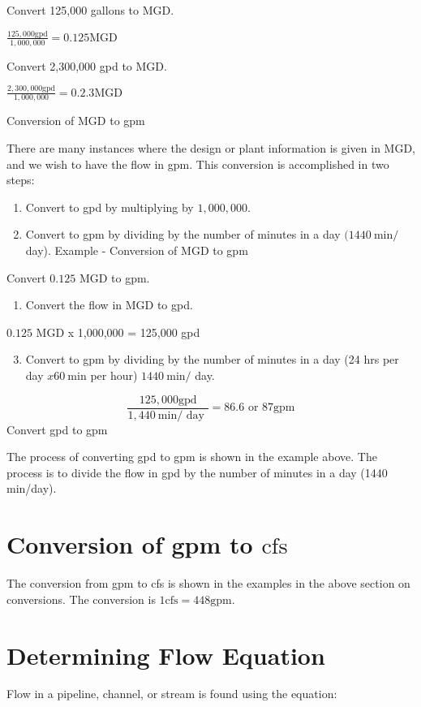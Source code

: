 Convert 125,000 gallons to MGD.

$\frac{125,000 \mathrm{gpd}}{1,000,000}=0.125 \mathrm{MGD}$

Convert 2,300,000 gpd to MGD.

$\frac{2,300,000 \mathrm{gpd}}{1,000,000}=0.2 .3 \mathrm{MGD}$

Conversion of MGD to gpm

There are many instances where the design or plant information is given in MGD, and we wish to have the flow in gpm. This conversion is accomplished in two steps:

\begin{enumerate}
  \item Convert to gpd by multiplying by $1,000,000$.

  \item Convert to gpm by dividing by the number of minutes in a day $(1440 \mathrm{~min} /$ day). Example - Conversion of MGD to gpm

\end{enumerate}
Convert $0.125$ MGD to gpm.

\begin{enumerate}
  \item Convert the flow in MGD to gpd.
\end{enumerate}
$0.125$ MGD x 1,000,000 = 125,000 gpd

\begin{enumerate}
  \setcounter{enumi}{2}
  \item Convert to gpm by dividing by the number of minutes in a day (24 hrs per day $x 60 \mathrm{~min}$ per hour) $1440 \mathrm{~min} /$ day.
\end{enumerate}
$$
\frac{125,000 \mathrm{gpd}}{1,440 \mathrm{~min} / \text { day }}=86.6 \text { or } 87 \mathrm{gpm}
$$
Convert gpd to gpm

The process of converting gpd to gpm is shown in the example above. The process is to divide the flow in gpd by the number of minutes in a day (1440 min/day).

\section{Conversion of gpm to $\mathrm{cfs}$}
The conversion from gpm to cfs is shown in the examples in the above section on conversions. The conversion is $1 \mathrm{cfs}=448 \mathrm{gpm}$.

\section{Determining Flow Equation}
Flow in a pipeline, channel, or stream is found using the equation:

